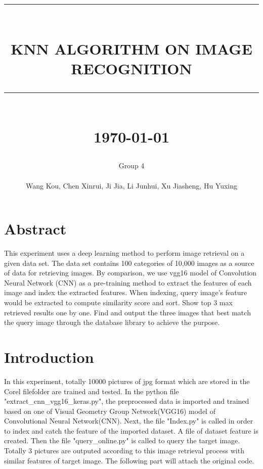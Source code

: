 \documentclass[12pt]{report}
\newcommand{\HRule}[1]{\rule{\linewidth}{#1}}
\begin{document}
\title{ \normalsize \textsc{}
		\\ [2.0cm]
		\HRule{0.5pt} \\
		\LARGE \textbf{\uppercase{KNN Algorithm on Image recognition}}
		\HRule{2pt} \\ [0.5cm]
		\normalsize \today \vspace*{5\baselineskip}}

\date{}

\author{
		Group 4 \\ 
		\\
		Wang Kou, Chen Xinrui, Ji Jia, Li Junhui, Xu Jiasheng, Hu Yuxing }





\maketitle
\tableofcontents
\newpage

\sectionfont{\scshape}

\chapter{Abstract}

This experiment uses a deep learning method to perform image retrieval on a given data set. The data set contains 100 categories of 10,000 images as a source of data for retrieving images. By comparison, we use vgg16 model of Convolution Neural Network (CNN) as a pre-training method to extract the features of each image and index the extracted features.
When indexing, query image's feature would be extracted to compute similarity score and sort. Show top 3 max retrieved results one by one. Find and output the three images that best match the query image through the database library to achieve the purpose.


\chapter{Introduction}

In this experiment, totally 10000 pictures of jpg format which are stored in the Corel filefolder are trained and tested. In the python file "extract\_cnn\_vgg16\_keras.py", the preprocessed data is imported and trained based on one of Visual Geometry Group Network(VGG16) model of Convolutional Neural Network(CNN). Next, the file "Index.py" is called in order to index and catch the feature of the imported dataset. A file of dataset feature is created. Then the file "query\_online.py" is called to query the target image. Totally 3 pictures are outputed according to this image retrieval process with similar features of target image. The following part will attach the original code.
\end{document}
